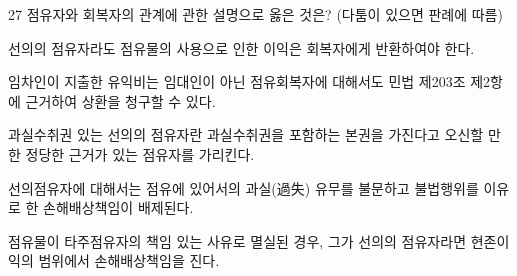 \begin{question}{27}
점유자와 회복자의 관계에 관한 설명으로 옳은 것은? (다툼이 있으면 판례에 따름)
\begin{choices}
  \item 선의의 점유자라도 점유물의 사용으로 인한 이익은 회복자에게 반환하여야 한다.
  \item 임차인이 지출한 유익비는 임대인이 아닌 점유회복자에 대해서도 민법 제203조 제2항에 근거하여 상환을 청구할 수 있다.
  \item 과실수취권 있는 선의의 점유자란 과실수취권을 포함하는 본권을 가진다고 오신할 만한 정당한 근거가 있는 점유자를 가리킨다.
  \item 선의점유자에 대해서는 점유에 있어서의 과실(過失) 유무를 불문하고 불법행위를 이유로 한 손해배상책임이 배제된다.
  \item 점유물이 타주점유자의 책임 있는 사유로 멸실된 경우, 그가 선의의 점유자라면 현존이익의 범위에서 손해배상책임을 진다.
\end{choices}
\end{question}
